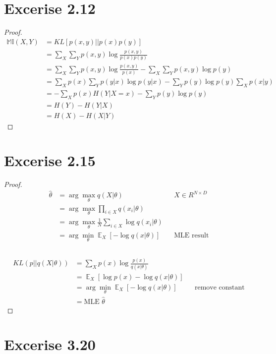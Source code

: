 \documentclass[12pt, letterpaper]{article}
\begin{document}
\section{Excerise 2.12}
\begin{proof}
\begin{align*}
    \mathbb{MI}(X, Y) &= KL[p(x, y) || p(x)p(y)] \\
        &= \sum_X \sum_Y p(x, y) \log \frac{p(x, y)}{p(x)p(y)} \\
        &= \sum_X \sum_Y p(x, y) \log \frac{p(x, y)}{p(x)} - \sum_X \sum_Y p(x,y) \log p(y) \\
        &= \sum_X p(x) \sum_Y p(y|x) \log p(y|x) - \sum_Y p(y) \log p(y) \sum_X p(x|y) \\
        &= - \sum_X p(x) H(Y|X=x) - \sum_Y p(y) \log p(y) \\
        &= H(Y) - H(Y|X) \\
        &= H(X) - H(X|Y)
\end{align*}
\end{proof}

\section{Excerise 2.15}
\begin{proof}
\begin{align*}
    \hat{\theta} &= \arg \max_{\theta} q(X|\theta) && \text{$X \in R^{N \times D}$} \\
      &= \arg \max_{\theta} \prod_{i\in X} q(x_i|\theta) \\
      &= \arg \max_{\theta} \frac{1}{N} \sum_{i\in X} \log q(x_i|\theta) \\
      &= \arg \min_{\theta} \mathop{\mathbb{E}}_X [- \log q(x|\theta)]  && \text{MLE result} \\ \\
\end{align*}

\begin{align*}
    KL(p || q(X|\theta)) &= \sum_X p(x) \log \frac{p(x)}{q(x|\theta)} \\
      &= \mathop{\mathbb{E}}_X [\log p(x) - \log q(x|\theta)] \\
      &= \arg \min_{\theta} \mathop{\mathbb{E}}_X [- \log q(x|\theta)] && \text{remove constant} \\
      &= \text{MLE $\hat{\theta}$}
\end{align*}
\end{proof}

\section{Excerise 3.20} 
\end{document}
